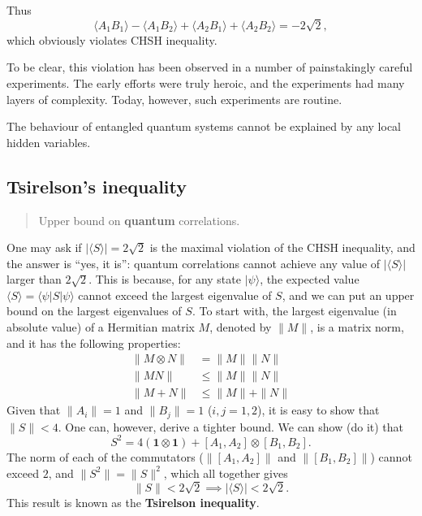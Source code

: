 \documentclass[fleqn]{article}
\newenvironment{idea}{\noindent}{\medskip}
\begin{document}
Thus
\[
  \langle A_1 B_1\rangle - \langle A_1 B_2\rangle + \langle A_2 B_1\rangle + \langle A_2 B_2\rangle
  = -2\sqrt{2},
\]
which obviously violates CHSH inequality.

To be clear, this violation has been observed in a number of painstakingly careful experiments.
The early efforts were truly heroic, and the experiments had many layers of complexity.
Today, however, such experiments are routine.

\begin{idea}

The behaviour of entangled quantum systems cannot be explained by any local hidden variables.

\end{idea}

\hypertarget{tsirelsons-inequality}{%
\subsection{Tsirelson's inequality}\label{tsirelsons-inequality}}

\begin{quote}
Upper bound on \textbf{quantum} correlations.
\end{quote}

One may ask if \(|\langle S\rangle|= 2\sqrt{2}\) is the maximal violation of the CHSH inequality, and the answer is ``yes, it is'': quantum correlations cannot achieve any value of \(|\langle S\rangle|\) larger than \(2\sqrt{2}\).
This is because, for any state \(|\psi\rangle\), the expected value \(\langle S\rangle = \langle\psi|S|\psi\rangle\) cannot exceed the largest eigenvalue of \(S\), and we can put an upper bound on the largest eigenvalues of \(S\).
To start with, the largest eigenvalue (in absolute value) of a Hermitian matrix \(M\), denoted by \(\|M\|\), is a matrix norm, and it has the following properties:
\[
\begin{aligned}
  \|M\otimes N\|
  & = \|M\| \|N\|
\\\|MN\|
  & \leqslant\|M\| \|N\|
\\\|M+N\|
  & \leqslant\|M\| + \|N\|
\end{aligned}
\]
Given that \(\|A_i\|=1\) and \(\|B_j\|=1\) (\(i,j=1,2\)), it is easy to show that \(\|S\| < 4\).
One can, however, derive a tighter bound.
We can show (do it) that
\[
  S^2
  = 4(\mathbf{1}\otimes\mathbf{1}) + [A_1,A_2]\otimes[B_1,B_2].
\]
The norm of each of the commutators (\(\|[A_1, A_2]\|\) and \(\|[B_1, B_2]\|\)) cannot exceed \(2\), and \(\|S^2\|=\|S\|^2\), which all together gives
\[
  \|S\|
  < 2\sqrt{2}
  \implies
  |\langle S\rangle| < 2\sqrt{2}.
\]
This result is known as the \textbf{Tsirelson inequality}.
\end{document}
